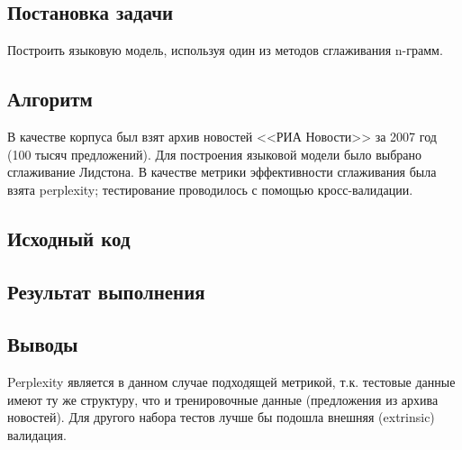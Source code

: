\documentclass[a4paper, 12pt]{article}
\begin{document}

\newpage


\subsection*{Постановка задачи}
Построить языковую модель, используя один из методов сглаживания n-грамм.

\subsection*{Алгоритм}
В качестве корпуса был взят архив новостей <<РИА Новости>> за 2007 год (100 тысяч предложений). Для построения языковой модели было выбрано сглаживание Лидстона. В качестве метрики эффективности сглаживания была взята perplexity; тестирование проводилось с помощью кросс-валидации.

\subsection*{Исходный код}



\subsection*{Результат выполнения}


\subsection*{Выводы}
Perplexity является в данном случае подходящей метрикой, т.к. тестовые данные имеют ту же структуру, что и тренировочные данные (предложения из архива новостей). Для другого набора тестов лучше бы подошла внешняя (extrinsic) валидация.
\end{document}
